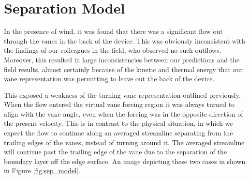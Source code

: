 


\section{Separation Model}
\label{sec:separation}

In the presence of wind, it was found that there was a significant flow
out through the vanes in the back of the device. This was obviously
inconsistent with the findings of our colleagues in the field, who
observed no such outflows. Moreover, this resulted
in large inconsistencies between our predictions and the field results,
almost certainly because of the kinetic and thermal energy that our vane
representation was permitting to leave out the back of the device.  

This exposed a weakness of the turning vane representation outlined
previously. When the flow entered the virtual vane forcing region it was
always turned to align with the vane angle, even when the forcing was in
the opposite direction of the present velocity. This is in contrast to
the physical situation, in which we expect the flow to continue along an
averaged streamline separating from the trailing edges of the vanes,
instead of turning around it. The averaged streamline will continue past
the trailing edge of the vane due to the separation of the boundary
layer off the edge surface. An image depicting these two cases in shown
in Figure \ref{fig:sep_model}.

